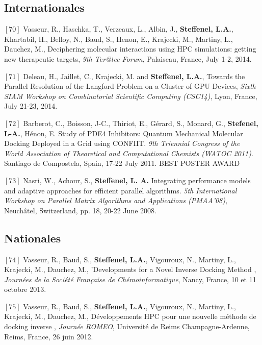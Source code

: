 \documentclass[final,twoside]{hdr} %
\begin{document}
\subsection*{Internationales}

\noindent $[70]$
Vasseur, R., Haschka, T., Verzeaux, L., Albin, J., \textbf{Steffenel, L.A.}, Khartabil, H., Belloy, N., Baud, S., Henon, E., Krajecki, M., Martiny, L., Dauchez, M., {Deciphering molecular interactions using HPC simulations: getting new therapeutic targets}, {\em 9th Ter@tec Forum}, Palaiseau, France, July 1-2, 2014.

\vspace{1em} \noindent $[71]$
Deleau, H., Jaillet, C., Krajecki, M. and \textbf{Steffenel, L.A.}, {Towards the Parallel Resolution of the Langford Problem on a Cluster of GPU Devices}, {\em Sixth SIAM Workshop on Combinatorial Scientific Computing (CSC14)}, Lyon, France, July 21-23, 2014.

\vspace{1em} \noindent $[72]$
Barberot, C., Boisson, J-C., Thiriot, E., Gérard, S., Monard, G., \textbf{Stefenel, L-A.}, Hénon, E. {Study of PDE4 Inhibitors: Quantum Mechanical Molecular Docking Deployed in a Grid using CONFIIT}. {\em 9th Triennial Congress of the World Association of Theoretical and Computational Chemists (WATOC 2011)}. Santiago de Compostela, Spain, 17-22 July 2011. BEST POSTER AWARD

\vspace{1em} \noindent $[73]$
Nasri, W., Achour, S., \textbf{Steffenel, L. A.} {Integrating performance models and adaptive approaches for efficient parallel algorithms}. {\em 5th International Workshop on Parallel Matrix Algorithms and Applications (PMAA'08)}, Neuchâtel, Switzerland, pp. 18, 20-22 June 2008. 

\subsection*{Nationales}

 \noindent $[74]$
Vasseur, R., Baud, S., \textbf{Steffenel, L.A.}, Vigouroux, N., Martiny, L., Krajecki, M., Dauchez, M., {'Developments for a Novel Inverse Docking Method} , {\em Journées de la Société Française de Chémoinformatique}, Nancy, France, 10 et 11 octobre 2013.

\vspace{1em} \noindent $[75]$
Vasseur, R., Baud, S.,\textbf{ Steffenel, L.A.}, Vigouroux, N., Martiny, L., Krajecki, M., Dauchez, M., {Développements HPC pour une nouvelle méthode de docking inverse} , {\em Journée ROMEO}, Université de Reims Champagne-Ardenne, Reims, France, 26 juin 2012.
\end{document}
